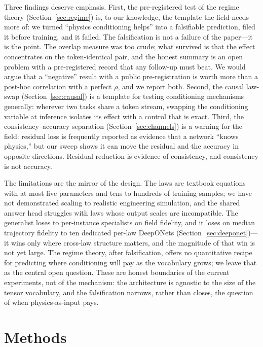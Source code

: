 \documentclass[11pt,a4paper]{article}
\begin{document}
Three findings deserve emphasis. First, the pre-registered test of the
regime theory (Section~\ref{sec:regime}) is, to our knowledge, the template
the field needs more of: we turned ``physics conditioning helps'' into a
falsifiable prediction, filed it before training, and it failed. The
falsification is not a failure of the paper---it is the point. The overlap
measure was too crude; what survived is that the effect concentrates on the
token-identical pair, and the honest summary is an open problem with a
pre-registered record that any follow-up must beat. We would argue that a
``negative'' result with a public pre-registration is worth more than a
post-hoc correlation with a perfect $\rho$, and we report both. Second, the
causal law-swap (Section~\ref{sec:causal}) is a template for testing
conditioning mechanisms generally: wherever two tasks share a token stream,
swapping the conditioning variable at inference isolates its effect with a
control that is exact. Third, the consistency--accuracy separation
(Section~\ref{sec:channels}) is a warning for the field: residual loss is
frequently reported as evidence that a network ``knows physics,'' but our
sweep shows it can move the residual and the accuracy in opposite
directions. Residual reduction is evidence of consistency, and consistency
is not accuracy.

The limitations are the mirror of the design. The laws are textbook equations
with at most five parameters and tens to hundreds of training samples; we have
not demonstrated scaling to realistic engineering simulation, and the shared
answer head struggles with laws whose output scales are incompatible.
The generalist loses to per-instance specialists on field fidelity, and it
loses on median trajectory fidelity to ten dedicated per-law DeepONets
(Section~\ref{sec:deeponet})---it wins only where cross-law structure
matters, and the magnitude of that win is not yet large. The regime theory,
after falsification, offers no quantitative recipe for predicting where
conditioning will pay as the vocabulary grows; we leave that as the central
open question. These are honest boundaries of the current experiments, not
of the mechanism: the architecture is agnostic to the size of the tensor
vocabulary, and the falsification narrows, rather than closes, the question
of when physics-as-input pays.

\section{Methods}
\label{sec:methods}
\end{document}
